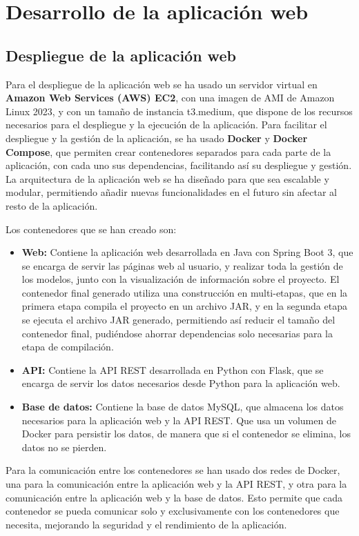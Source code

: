 \section{Desarrollo de la aplicación web}


\subsection{Despliegue de la aplicación web}
Para el despliegue de la aplicación web se ha usado un servidor virtual en \textbf{Amazon Web Services (AWS) EC2}, con una imagen de AMI de Amazon Linux 2023, y con un tamaño de instancia t3.medium, que dispone de los recursos necesarios para el despliegue y la ejecución de la aplicación.
Para facilitar el despliegue y la gestión de la aplicación, se ha usado \textbf{Docker} y \textbf{Docker Compose}, que permiten crear contenedores separados para cada parte de la aplicación, con cada uno sus dependencias, facilitando así su despliegue y gestión.
La arquitectura de la aplicación web se ha diseñado para que sea escalable y modular, permitiendo añadir nuevas funcionalidades en el futuro sin afectar al resto de la aplicación.

Los contenedores que se han creado son:
\begin{itemize}
    \item \textbf{Web:} Contiene la aplicación web desarrollada en Java con Spring Boot 3, que se encarga de servir las páginas web al usuario, y realizar toda la gestión de los modelos, junto con la visualización de información sobre el proyecto. El contenedor final generado utiliza una construcción en multi-etapas, que en la primera etapa compila el proyecto en un archivo JAR, y en la segunda etapa se ejecuta el archivo JAR generado, permitiendo así reducir el tamaño del contenedor final, pudiéndose ahorrar dependencias solo necesarias para la etapa de compilación.
    \item \textbf{API:} Contiene la API REST desarrollada en Python con Flask, que se encarga de servir los datos necesarios desde Python para la aplicación web.
    \item \textbf{Base de datos:} Contiene la base de datos MySQL, que almacena los datos necesarios para la aplicación web y la API REST. Que usa un volumen de Docker para persistir los datos, de manera que si el contenedor se elimina, los datos no se pierden.
\end{itemize}
Para la comunicación entre los contenedores se han usado dos redes de Docker, una para la comunicación entre la aplicación web y la API REST, y otra para la comunicación entre la aplicación web y la base de datos. Esto permite que cada contenedor se pueda comunicar solo y exclusivamente con los contenedores que necesita, mejorando la seguridad y el rendimiento de la aplicación.

